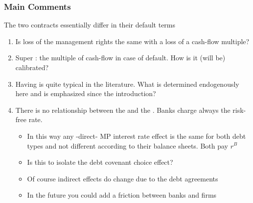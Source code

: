 \documentclass[xcolor=dvipsnames,handout]{beamer}
\begin{document}
\begin{frame}[t]\frametitle {\textbf{Main Comments}} \label{conclusion}

The two contracts essentially differ in their default terms
\begin{enumerate}
\item Is loss of the management rights the same with a loss of a cash-flow multiple?
\item Super {\color{blue}{important parameter}}: the multiple {\color{blue}{$\phi$}} of cash-flow in case of default. How is it (will be)  calibrated?
\item Having {\color{blue}{endogenous borrowing constraints}} is quite typical in the literature. What is determined endogenously here and is emphasized since the introduction?
\item There is no relationship between the {\color{blue}{debt covenant}} and the {\color{blue}{interest rate}}. Banks charge always the risk-free rate. 
\begin{itemize}
    \item In this way any -direct- MP interest rate effect is the same for both debt types and not different according to their balance sheets. Both pay $r^B$
    \item Is this to isolate the debt covenant choice effect?
    \item Of course indirect effects do change due to the debt agreements
    \item In the future you could add a friction between banks and firms
\end{itemize}
\end{enumerate}
\end{frame}
\end{document}
